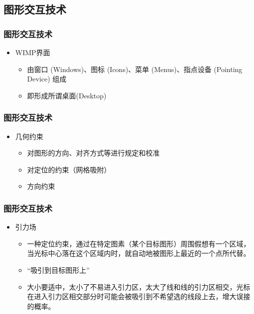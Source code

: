 \documentclass{beamer}
\newcommand{\fullPageImage}[2]{
	{
		\usebackgroundtemplate{\texttt{[image: \#1]}}
		\frame[plain]{#2}
	}
}
\begin{document}

\subsection{图形交互技术}
\begin{frame}
	\frametitle{图形交互技术}
	\begin{itemize}
		\item WIMP界面~\cite{hinckley1996haptic} 
		\begin{itemize}
			\item 由窗口 (Windows)、图标 (Icons)、菜单 (Menus)、指点设备 (Pointing Device) 组成
			\item 即形成所谓桌面(Desktop)
		\end{itemize}
	\end{itemize}
\end{frame}

\fullPageImage{images/xerox.big.png}{\transwipe}

\begin{frame}
	\frametitle{图形交互技术}
	\begin{itemize}
		\item 几何约束
		\begin{itemize}
			\item 对图形的方向、对齐方式等进行规定和校准
			\item 对定位的约束（网格吸附）
			\item 方向约束
		\end{itemize}
	\end{itemize}
\end{frame}

\begin{frame}
	\frametitle{图形交互技术}
	\begin{itemize}
		\item 引力场
		\begin{itemize}
			\item 一种定位约束，通过在特定图素（某个目标图形）周围假想有一个区域，当光标中心落在这个区域内时，就自动地被图形上最近的一个点所代替。
			\item ``吸引到目标图形上''
			\item 大小要适中，太小了不易进入引力区，太大了线和线的引力区相交，光标在进入引力区相交部分时可能会被吸引到不希望选的线段上去，增大误接的概率。
		\end{itemize}
	\end{itemize}
\end{frame}
\end{document}
